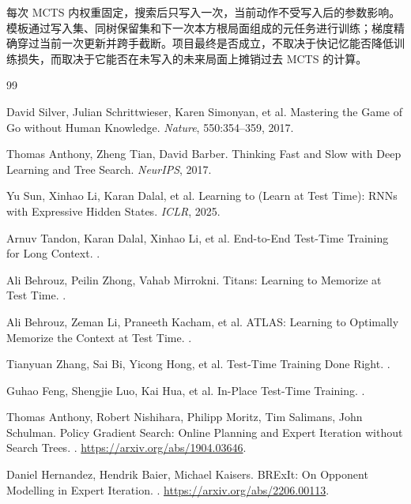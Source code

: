 \documentclass[UTF8,11pt,a4paper]{ctexart}
\begin{document}
每次 MCTS 内权重固定，搜索后只写入一次，当前动作不受写入后的参数影响。模板通过写入集、同树保留集和下一次本方根局面组成的元任务进行训练；梯度精确穿过当前一次更新并跨手截断。项目最终是否成立，不取决于快记忆能否降低训练损失，而取决于它能否在未写入的未来局面上摊销过去 MCTS 的计算。

\begin{thebibliography}{99}
\small

David Silver, Julian Schrittwieser, Karen Simonyan, et al.
\newblock Mastering the Game of Go without Human Knowledge.
\newblock \emph{Nature}, 550:354--359, 2017.

Thomas Anthony, Zheng Tian, David Barber.
\newblock Thinking Fast and Slow with Deep Learning and Tree Search.
\newblock \emph{NeurIPS}, 2017.

Yu Sun, Xinhao Li, Karan Dalal, et al.
\newblock Learning to (Learn at Test Time): RNNs with Expressive Hidden States.
\newblock \emph{ICLR}, 2025.

Arnuv Tandon, Karan Dalal, Xinhao Li, et al.
\newblock End-to-End Test-Time Training for Long Context.
.

Ali Behrouz, Peilin Zhong, Vahab Mirrokni.
\newblock Titans: Learning to Memorize at Test Time.
.

Ali Behrouz, Zeman Li, Praneeth Kacham, et al.
\newblock ATLAS: Learning to Optimally Memorize the Context at Test Time.
.

Tianyuan Zhang, Sai Bi, Yicong Hong, et al.
\newblock Test-Time Training Done Right.
.

Guhao Feng, Shengjie Luo, Kai Hua, et al.
\newblock In-Place Test-Time Training.
.

Thomas Anthony, Robert Nishihara, Philipp Moritz, Tim Salimans, John Schulman.
\newblock Policy Gradient Search: Online Planning and Expert Iteration without Search Trees.
. \url{https://arxiv.org/abs/1904.03646}.

Daniel Hernandez, Hendrik Baier, Michael Kaisers.
\newblock BRExIt: On Opponent Modelling in Expert Iteration.
. \url{https://arxiv.org/abs/2206.00113}.

\end{thebibliography}
\end{document}
